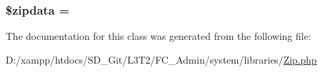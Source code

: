 \subsubsection[{\$zipdata}]{\setlength{\rightskip}{0pt plus 5cm}\$zipdata = \textquotesingle{}\textquotesingle{}}\label{class_c_i___zip_a395accfd5884d9a0e6fd53470b3e85b1}


The documentation for this class was generated from the following file\+:\begin{DoxyCompactItemize}
\item 
D\+:/xampp/htdocs/\+S\+D\+\_\+\+Git/\+L3\+T2/\+F\+C\+\_\+\+Admin/system/libraries/\hyperlink{_zip_8php}{Zip.\+php}\end{DoxyCompactItemize}
